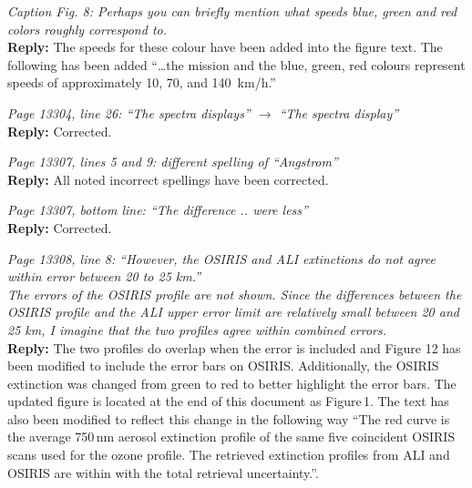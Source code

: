 \documentclass[12pt, notitlepage]{article}
\begin{document}
\textit{Caption Fig. 8: Perhaps you can briefly mention what speeds blue, green and red
colors roughly correspond to.}\\

\textbf{Reply:} The speeds for these colour have been added into the figure text. The following has been added ``\ldots the
  mission and the blue, green, red colours represent speeds of approximately
  10, 70, and 140~km/h.''

\hrulefill

\textit{Page 13304, line 26: ``The spectra displays'' $\rightarrow$ ``The spectra display''}\\

\textbf{Reply:} Corrected.

\hrulefill

\textit{Page 13307, lines 5 and 9: different spelling of ``Angstrom''}\\

\textbf{Reply:} All noted incorrect spellings have been corrected.

\hrulefill

\textit{Page 13307, bottom line: ``The difference .. were less''}\\

\textbf{Reply:} Corrected.

\hrulefill

\textit{Page 13308, line 8: ``However, the OSIRIS and ALI extinctions do not agree within error
between 20 to 25 km.''}\\

\textit{The errors of the OSIRIS profile are not shown. Since the differences between the
OSIRIS profile and the ALI upper error limit are relatively small between 20 and 25 km,
I imagine that the two profiles agree within combined errors.}\\

\textbf{Reply:} The two profiles do overlap when the error is included and Figure 12 has
been modified to include the error bars on OSIRIS. Additionally, the OSIRIS extinction was changed from green to red to better highlight the error bars. The updated figure is located at the end of this document as Figure\,1.
The text has also been modified to reflect this change in the following way ``The red
curve is the average 750\,nm aerosol extinction profile of the
same five coincident OSIRIS scans used for the ozone profile. The
retrieved extinction profiles from ALI and OSIRIS are within with the
total retrieval uncertainty.''.
\end{document}
